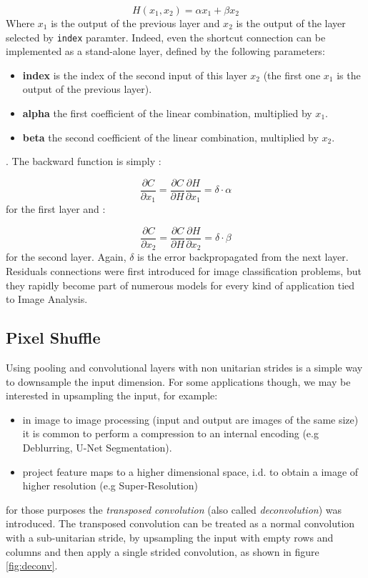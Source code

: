 \documentclass[12pt,a4paper]{report}
\begin{document}
\begin{equation}
 H(x_1, x_2) = \alpha x_1 + \beta x_2
\end{equation}
Where $x_1$ is the output of the previous layer and $x_2$ is the output of the layer selected by \texttt{index} paramter. Indeed, even the shortcut connection can be implemented as a stand-alone layer, defined by the following parameters:

\begin{itemize}
 \setlength\itemsep{-0.2em}
 \item {\bf index} is the index of the second input of this layer $x_2$ (the first one $x_1$ is the output of the previous layer).
 \item {\bf alpha} the first coefficient of the linear combination, multiplied by $x_1$.
 \item {\bf beta} the second coefficient of the linear combination, multiplied by $x_2$.
\end{itemize}
.
The backward function is simply :

\begin{equation}
 \frac{\partial C}{\partial x_1} = \frac{\partial C}{\partial H}\frac{\partial H}{\partial x_1} = \delta \cdot \alpha
\end{equation}
for the first layer and :

\begin{equation}
 \frac{\partial C}{\partial x_2} = \frac{\partial C}{\partial H}\frac{\partial H}{\partial x_2} = \delta \cdot \beta
\end{equation}
for the second layer. Again, $\delta$ is the error backpropagated from the next layer. 
Residuals connections were first introduced for image classification problems, but they rapidly become part of numerous models for every kind of application tied to Image Analysis.

\subsection*{Pixel Shuffle}

Using pooling and convolutional layers with non unitarian strides is a simple way to downsample the input dimension. 
For some applications though, we may be interested in upsampling the input, for example: 

\begin{itemize}
 \setlength\itemsep{-0.2em}
 \item in image to image processing (input and output are images of the same size) it is common to perform a compression to an internal encoding (e.g Deblurring, U-Net Segmentation). 
 \item project feature maps to a higher dimensional space, i.d. to obtain a image of higher resolution (e.g Super-Resolution)
\end{itemize}
for those purposes the {\it transposed convolution} (also called {\it deconvolution}) was introduced. 
The transposed convolution can be treated as a normal convolution with a sub-unitarian stride, by upsampling the input with empty rows and columns and then apply a single strided convolution, as shown in figure \ref{fig:deconv}.
\end{document}
